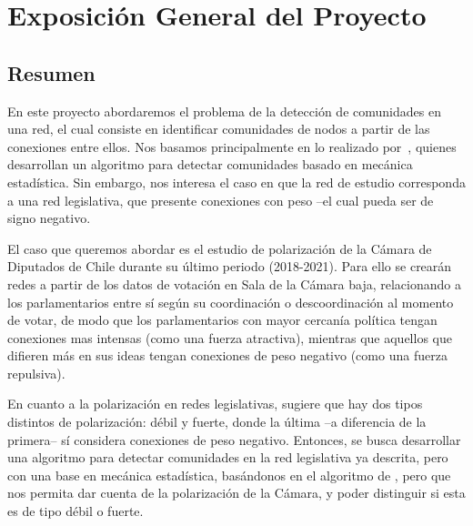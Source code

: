 \documentclass{proyectotesis}
\begin{document}
\newpage

\section{Exposición General del Proyecto}
\subsection{Resumen}
En este proyecto abordaremos el problema de la detección de comunidades en una red, el cual consiste en identificar comunidades de nodos a partir de las conexiones entre ellos. Nos basamos principalmente en lo realizado por~\citet{reichardt_statistical_2006}, quienes desarrollan un algoritmo para detectar comunidades basado en mecánica estadística. Sin embargo, nos interesa el caso en que la red de estudio corresponda a una red legislativa, que presente conexiones con peso --el cual pueda ser de signo negativo.

El caso que queremos abordar es el estudio de polarización de la Cámara de Diputados de Chile durante su último periodo (2018-2021). Para ello se crearán redes a partir de los datos de votación en Sala de la Cámara baja, relacionando a los parlamentarios entre sí según su coordinación o descoordinación al momento de votar, de modo que los parlamentarios con mayor cercanía política tengan conexiones mas intensas (como una fuerza atractiva), mientras que aquellos que difieren más en sus ideas tengan conexiones de peso negativo (como una fuerza repulsiva). 

En cuanto a la polarización en redes legislativas, \citet{neal_sign_2020} sugiere que hay dos tipos distintos de polarización: débil y fuerte, donde la última --a diferencia de la primera-- sí considera conexiones de peso negativo. 
Entonces, se busca desarrollar una algoritmo para detectar comunidades en la red legislativa ya descrita, pero con una base en mecánica estadística, basándonos en el algoritmo de \citet{reichardt_statistical_2006}, pero que nos permita dar cuenta de la polarización de la Cámara, y poder distinguir si esta es de tipo débil o fuerte.
\end{document}
